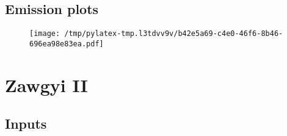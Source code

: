 \documentclass{article}%
\begin{document}
\subsection{Emission plots}%
\label{subsec:Emissionplots}%


\begin{figure}[htbp]%
\centering%
\texttt{[image: /tmp/pylatex-tmp.l3tdvv9v/b42e5a69-c4e0-46f6-8b46-696ea98e83ea.pdf]}%
\end{figure}

%
\section{Zawgyi II}%
\label{sec:ZawgyiII}%
\subsection{Inputs}%
\label{subsec:Inputs}%
\end{document}
